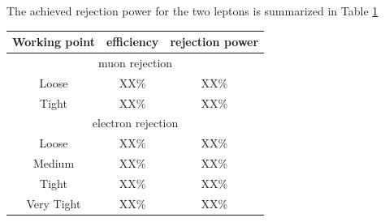 The achieved rejection power for the two leptons is summarized in Table \ref{tab:tau_lep_rej}

\begin{table}
\begin{center}
\begin{tabular}{|c|c|c|}
 \toprule
 Working point & efficiency & rejection power \\
 \midrule
 \multicolumn{3}{|c|}{muon rejection} \\
 \hline
 Loose & XX\% & XX\% \\
 Tight   & XX\% & XX\% \\
 \hline
 \multicolumn{3}{|c|}{electron rejection} \\
 \hline
 Loose    & XX\% & XX\% \\
 Medium & XX\% & XX\% \\
 Tight     & XX\% & XX\% \\
 Very Tight & XX\% & XX\% \\
 \bottomrule
\end{tabular}
\end{center}
\label{tab:tau_lep_rej}
\end{table}
